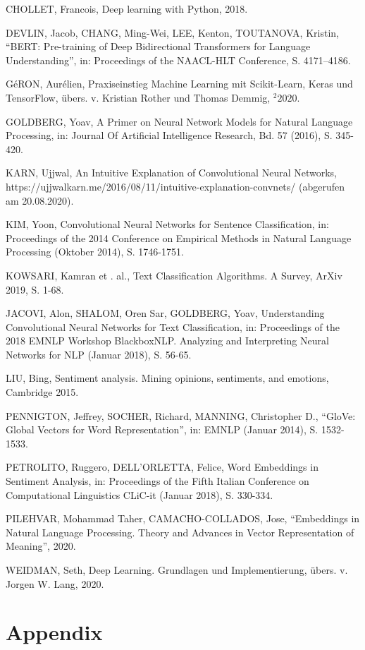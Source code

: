 \documentclass[11pt]{article}
\begin{document}
CHOLLET, Francois, Deep learning with Python, 2018.

DEVLIN, Jacob, CHANG, Ming-Wei, LEE, Kenton, TOUTANOVA, Kristin, ``BERT:
Pre-training of Deep Bidirectional Transformers for Language
Understanding'', in: Proceedings of the NAACL-HLT Conference, S.
4171--4186.

GéRON, Aurélien, Praxiseinstieg Machine Learning mit Scikit-Learn, Keras
und TensorFlow, übers. v. Kristian Rother und Thomas Demmig,
\({^2}2020\).

GOLDBERG, Yoav, A Primer on Neural Network Models for Natural Language
Processing, in: Journal Of Artificial Intelligence Research, Bd. 57
(2016), S. 345-420.

KARN, Ujjwal, An Intuitive Explanation of Convolutional Neural Networks,
https://ujjwalkarn.me/2016/08/11/intuitive-explanation-convnets/
(abgerufen am 20.08.2020).

KIM, Yoon, Convolutional Neural Networks for Sentence Classification,
in: Proceedings of the 2014 Conference on Empirical Methods in Natural
Language Processing (Oktober 2014), S. 1746-1751.

KOWSARI, Kamran et . al., Text Classification Algorithms. A Survey,
ArXiv 2019, S. 1-68.

JACOVI, Alon, SHALOM, Oren Sar, GOLDBERG, Yoav, Understanding
Convolutional Neural Networks for Text Classification, in: Proceedings
of the 2018 EMNLP Workshop BlackboxNLP. Analyzing and Interpreting
Neural Networks for NLP (Januar 2018), S. 56-65.

LIU, Bing, Sentiment analysis. Mining opinions, sentiments, and
emotions, Cambridge 2015.

PENNIGTON, Jeffrey, SOCHER, Richard, MANNING, Christopher D., ``GloVe:
Global Vectors for Word Representation'', in: EMNLP (Januar 2014), S.
1532-1533.

PETROLITO, Ruggero, DELL'ORLETTA, Felice, Word Embeddings in Sentiment
Analysis, in: Proceedings of the Fifth Italian Conference on
Computational Linguistics CLiC-it (Januar 2018), S. 330-334.

PILEHVAR, Mohammad Taher, CAMACHO-COLLADOS, Jose, ``Embeddings in
Natural Language Processing. Theory and Advances in Vector
Representation of Meaning'', 2020.

WEIDMAN, Seth, Deep Learning. Grundlagen und Implementierung, übers. v.
Jorgen W. Lang, 2020.

    \hypertarget{appendix}{%
\section{Appendix}\label{appendix}}
\end{document}
